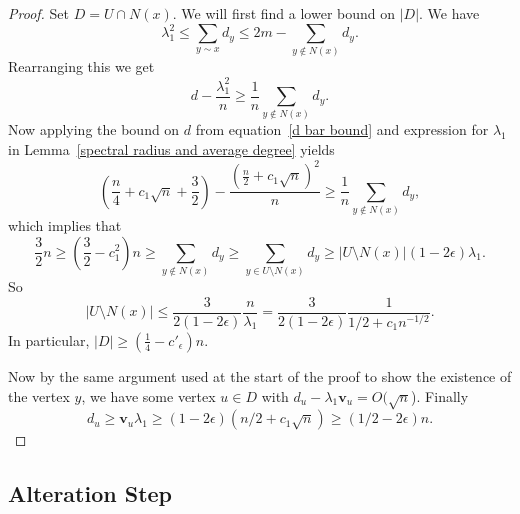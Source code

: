 \begin{proof}
Set $D = U \cap N(x)$.  We will first find a lower bound on $|D|$.  We have
 \begin{equation*}
  \lambda_1^2 \leq \sum_{y \sim x} d_y \leq 2m - \sum_{y \not \in N(x)} d_y.
 \end{equation*}
Rearranging this we get 
 \[ d - \frac{\lambda_1^2}{n} \geq \frac{1}{n} \sum_{y \not \in N(x)} d_y.\]
Now applying the bound on $d$ from equation~\ref{d bar bound} and expression for $\lambda_1$ in Lemma~\ref{spectral radius and average degree} yields
 \[ \left( \frac{n}{4} + c_1 \sqrt{n} + \frac{3}{2}\right) - \frac{\left(\frac{n}{2} + c_1 \sqrt{n}\right)^2}{n} \geq \frac{1}{n} \sum_{y \not \in N(x)} d_y, \]
which implies that
 \[ \frac{3}{2} n \geq \left( \frac{3}{2} - c_1^2 \right) n \geq \sum_{y \not \in N(x)} d_y \geq \sum_{y \in U\setminus N(x)} d_y \geq |U\setminus N(x)| (1-2\epsilon) \lambda_1 .\]
So 
 \[ |U \setminus N(x)| \leq \frac{3}{2(1-2\epsilon)} \frac{n}{\lambda_1} = \frac{3}{2(1-2\epsilon)} \frac{1}{1/2 + c_1 n^{-1/2}} .\]
In particular, $|D| \geq (\frac{1}{4} - c'_\epsilon) n$.

Now by the same argument used at the start of the proof to show the existence
of the vertex $y$, we have some vertex $u \in D$
with $d_u - \lambda_1 \mathbf{v}_u = O(\sqrt{n}$).   Finally 
\[d_u \geq \mathbf{v}_u \lambda_1 \geq (1 - 2 \epsilon) (n/2 + c_1\sqrt{n}) \geq \left( 1/2 - 2\epsilon \right)n .  \]

\end{proof}

\subsection{Alteration Step}

